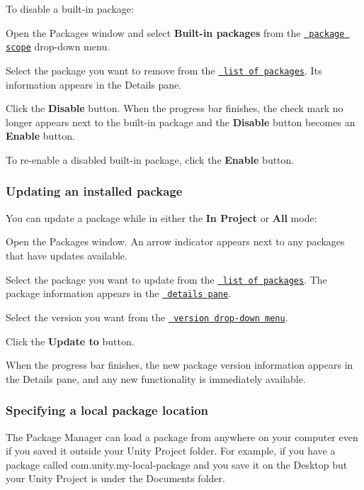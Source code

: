 To disable a built-\/in package\+:
\begin{DoxyEnumerate}
\item Open the Packages window and select {\bfseries{Built-\/in packages}} from the \href{\#scope}{\texttt{ package scope}} drop-\/down menu.
\item Select the package you want to remove from the \href{\#PackManLists}{\texttt{ list of packages}}. Its information appears in the Details pane.
\item Click the {\bfseries{Disable}} button. When the progress bar finishes, the check mark no longer appears next to the built-\/in package and the {\bfseries{Disable}} button becomes an {\bfseries{Enable}} button.
\end{DoxyEnumerate}

To re-\/enable a disabled built-\/in package, click the {\bfseries{Enable}} button.

\label{_PackManUpdate}%
 \subsubsection*{Updating an installed package}

You can update a package while in either the {\bfseries{In Project}} or {\bfseries{All}} mode\+:


\begin{DoxyEnumerate}
\item Open the Packages window. An arrow indicator appears next to any packages that have updates available.
\item Select the package you want to update from the \href{\#PackManLists}{\texttt{ list of packages}}. The package information appears in the \href{\#PackManDetails}{\texttt{ details pane}}.
\item Select the version you want from the \href{\#VersionList}{\texttt{ version drop-\/down menu}}.
\item Click the {\bfseries{Update to}} button.
\end{DoxyEnumerate}

When the progress bar finishes, the new package version information appears in the Details pane, and any new functionality is immediately available.

\label{_extpkg}%
 \subsubsection*{Specifying a local package location}

The Package Manager can load a package from anywhere on your computer even if you saved it outside your Unity Project folder. For example, if you have a package called {\ttfamily com.\+unity.\+my-\/local-\/package} and you save it on the {\ttfamily Desktop} but your Unity Project is under the {\ttfamily Documents} folder.

